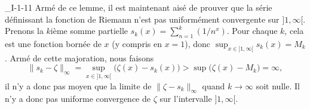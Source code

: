 \begin{corrige}{_I-1-11}
Armé de ce lemme, il est maintenant aisé de prouver que la série définissant la fonction de Riemann n'est pas uniformément convergente sur $]1,\infty[$. Prenons la $k$ième somme partielle $s_k(x)=\sum_{n=1}^k(1/n^x)$. Pour chaque $k$, cela est une fonction bornée de $x$ (y compris en $x=1$), donc $\sup_{x\in]1,\infty[}s_k(x)=M_k$. Armé de cette majoration, nous faisons
\begin{equation}
	\| s_k-\zeta \|_{\infty}=\sup_{x\in]1,\infty[}\big( \zeta(x)-s_k(x) \big)>\sup\big( \zeta(x)-M_k \big)=\infty,
\end{equation}
il n'y a donc pas moyen que la limite de $\| \zeta-s_k \|_{\infty}$ quand $k\to\infty$ soit nulle. Il n'y a donc pas uniforme convergence de $\zeta$ sur l'intervalle $]1,\infty[$.


\end{corrige}
